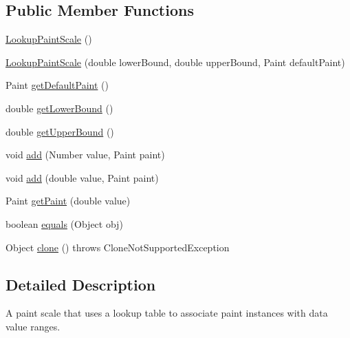\subsection*{Public Member Functions}
\begin{DoxyCompactItemize}
\item 
\mbox{\hyperlink{classorg_1_1jfree_1_1chart_1_1renderer_1_1_lookup_paint_scale_a2f6388ccc77dbe8c7d342a40198e83a6}{Lookup\+Paint\+Scale}} ()
\item 
\mbox{\hyperlink{classorg_1_1jfree_1_1chart_1_1renderer_1_1_lookup_paint_scale_ad9db0619c71c8803a363963ea4051ca2}{Lookup\+Paint\+Scale}} (double lower\+Bound, double upper\+Bound, Paint default\+Paint)
\item 
Paint \mbox{\hyperlink{classorg_1_1jfree_1_1chart_1_1renderer_1_1_lookup_paint_scale_ab0716e02714ce29375ca366aa76e65fa}{get\+Default\+Paint}} ()
\item 
double \mbox{\hyperlink{classorg_1_1jfree_1_1chart_1_1renderer_1_1_lookup_paint_scale_a7ef26ef52021e5a5c09b28c174913511}{get\+Lower\+Bound}} ()
\item 
double \mbox{\hyperlink{classorg_1_1jfree_1_1chart_1_1renderer_1_1_lookup_paint_scale_ad7956f5f6498550f77ce5c7ed8f22583}{get\+Upper\+Bound}} ()
\item 
void \mbox{\hyperlink{classorg_1_1jfree_1_1chart_1_1renderer_1_1_lookup_paint_scale_a381c4195f78e3e182d1e518500a78151}{add}} (Number value, Paint paint)
\item 
void \mbox{\hyperlink{classorg_1_1jfree_1_1chart_1_1renderer_1_1_lookup_paint_scale_a691420f855702671a42b1fde5adccb16}{add}} (double value, Paint paint)
\item 
Paint \mbox{\hyperlink{classorg_1_1jfree_1_1chart_1_1renderer_1_1_lookup_paint_scale_a8a1dcf9c72f6844f8a0aee28b98e4134}{get\+Paint}} (double value)
\item 
boolean \mbox{\hyperlink{classorg_1_1jfree_1_1chart_1_1renderer_1_1_lookup_paint_scale_ae3a42b32c206176fdd037699d5e9e2cc}{equals}} (Object obj)
\item 
Object \mbox{\hyperlink{classorg_1_1jfree_1_1chart_1_1renderer_1_1_lookup_paint_scale_a6af6382886c03d69dc8e490959a642ad}{clone}} ()  throws Clone\+Not\+Supported\+Exception 
\end{DoxyCompactItemize}


\subsection{Detailed Description}
A paint scale that uses a lookup table to associate paint instances with data value ranges.

